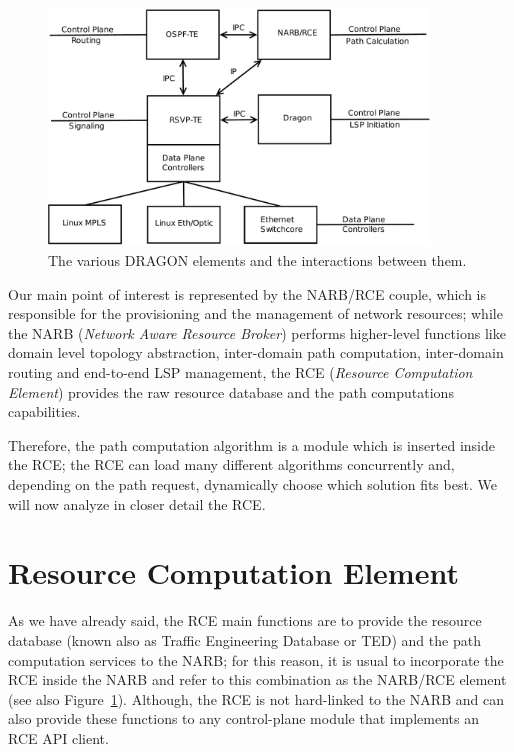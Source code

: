 \documentclass[10pt,a4paper]{report}
\begin{document}
\begin{figure}[!htbp]
  \begin{center}
    \includegraphics[width=0.9\textwidth]{img/dragon_model}
    \caption[DRAGON model]{The various DRAGON elements and the
      interactions between them.}
    \label{fig:dragon_model}
  \end{center}
\end{figure}

Our main point of interest is represented by the NARB/RCE couple,
which is responsible for the provisioning and the management of
network resources; while the NARB (\textit{Network Aware Resource
  Broker}) performs higher-level functions like domain level topology
abstraction, inter-domain path computation, inter-domain routing and
end-to-end LSP management, the RCE (\textit{Resource Computation
  Element}) provides the raw resource database and the path
computations capabilities.

Therefore, the path computation algorithm is a module which is
inserted inside the RCE; the RCE can load many different algorithms
concurrently and, depending on the path request, dynamically choose
which solution fits best. We will now analyze in closer detail the
RCE.

\section{Resource Computation Element}

As we have already said, the RCE main functions are to provide the
resource database (known also as Traffic Engineering Database or TED)
and the path computation services to the NARB; for this reason, it is
usual to incorporate the RCE inside the NARB and refer to this
combination as the NARB/RCE element (see also
Figure~\ref{fig:dragon_model}). Although, the RCE is not hard-linked
to the NARB and can also provide these functions to any control-plane
module that implements an RCE API client.
\end{document}
